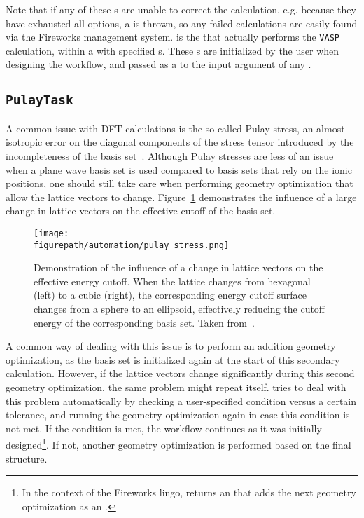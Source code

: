 \begin{refsection}
\begin{itemize}
\end{itemize} 
 
Note that if any of these s are unable to correct the 
calculation, e.g. because they have exhausted all options, a 
 is thrown, so any failed calculations are easily 
found via the Fireworks management system.  is the 
 that actually performs the \texttt{VASP} calculation, within a 
 with specified s. These 
s are initialized by the user when designing the workflow, 
and passed as a  to the  input argument of any 
. 
 
\subsection{\texttt{PulayTask}} \label{automation:sec-PulayTask} 
 
A common issue with DFT calculations is the so-called Pulay stress, an almost 
isotropic error on the diagonal components of the stress tensor introduced by 
the incompleteness of the basis set~\cite{Francis1990}. Although Pulay 
stresses are less of an issue when a \hyperref[dft:sec-planewave]{plane wave 
basis set} is used compared to basis sets that rely on the ionic positions, 
one should still take care when performing geometry optimization that allow 
the lattice vectors to change. Figure~\ref{automation:fig-pulay} demonstrates 
the influence of a large change in lattice vectors on the effective cutoff of 
the basis set.  
 
\begin{figure} 
\centering 
\texttt{[image: \\figurepath/automation/pulay\_stress.png]} 
\caption{Demonstration of the influence of a change in lattice vectors on the 
effective energy cutoff. When the lattice changes from hexagonal (left) to a 
cubic (right), the corresponding energy cutoff surface changes from a sphere 
to an ellipsoid, effectively reducing the cutoff energy of the corresponding 
basis set. Taken from~\cite{Pulay}.} 
\label{automation:fig-pulay} 
\end{figure} 
 
A common way of dealing with this issue is to perform an addition geometry 
optimization, as the basis set is initialized again at the start of this 
secondary calculation. However, if the lattice vectors change significantly 
during this second geometry optimization, the same problem might repeat 
itself.  tries to deal with this problem automatically by 
checking a user-specified condition versus a certain tolerance, and running 
the geometry optimization again in case this condition is not met. If the 
condition is met, the workflow continues as it was initially 
designed\footnote{In the context of the Fireworks lingo,  
returns an  that adds the next geometry optimization as an 
.}. If not, another geometry optimization is performed based on 
the final structure. 
 

\end{refsection}
